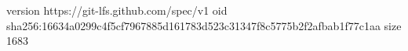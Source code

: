 version https://git-lfs.github.com/spec/v1
oid sha256:16634a0299c4f5cf7967885d161783d523c31347f8c5775b2f2afbab1f77c1aa
size 1683
